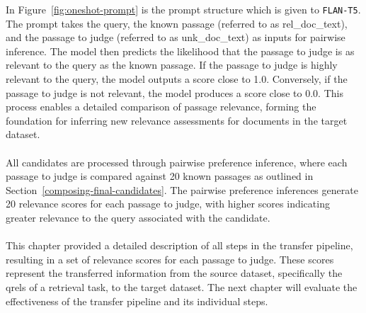 In Figure~\ref{fig:oneshot-prompt} is the prompt structure which is given to \texttt{FLAN-T5}. The prompt takes the query, the known passage (referred to as rel\_doc\_text), and the passage to judge (referred to as unk\_doc\_text) as inputs for pairwise inference. The model then predicts the likelihood that the passage to judge is as relevant to the query as the known passage. If the passage to judge is highly relevant to the query, the model outputs a score close to 1.0. Conversely, if the passage to judge is not relevant, the model produces a score close to 0.0. This process enables a detailed comparison of passage relevance, forming the foundation for inferring new relevance assessments for documents in the target dataset.
\\\\
All candidates are processed through pairwise preference inference, where each passage to judge is compared against 20 known passages as outlined in Section~\ref{composing-final-candidates}. The pairwise preference inferences generate 20 relevance scores for each passage to judge, with higher scores indicating greater relevance to the query associated with the candidate.
\\\\
This chapter provided a detailed description of all steps in the transfer pipeline, resulting in a set of relevance scores for each passage to judge. These scores represent the transferred information from the source dataset, specifically the qrels of a retrieval task, to the target dataset. The next chapter will evaluate the effectiveness of the transfer pipeline and its individual steps.